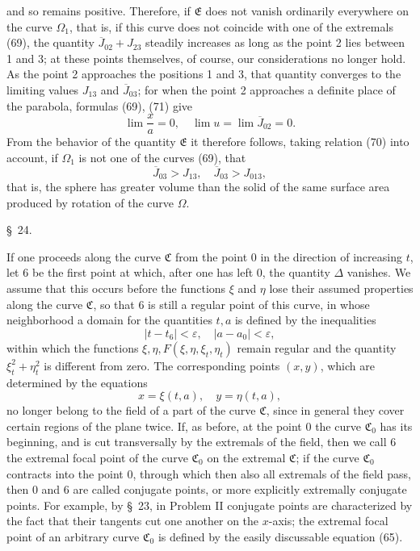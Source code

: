 \documentclass[11pt,a4paper,leqno]{article}
\begin{document}
and so remains positive. Therefore, if $\mathfrak{E}$ does not vanish ordinarily everywhere on the curve $\Omega_1$, that is, if this curve does not coincide with one of the extremals (69), the quantity $\overline{J}_{02}+J_{23}$ steadily increases as long as the point 2 lies between 1 and 3; at these points themselves, of course, our considerations no longer hold. As the point 2 approaches the positions 1 and 3, that quantity converges to the limiting values $J_{13}$ and $\overline{J}_{03}$; for when the point 2 approaches a definite place of the parabola, formulas (69), (71) give
\[
\lim\frac{x}{a}=0,\quad \lim u=\lim\overline{J}_{02}=0.
\]
From the behavior of the quantity $\mathfrak{E}$ it therefore follows, taking relation (70) into account, if $\Omega_1$ is not one of the curves (69), that
\[
\overline{J}_{03}>J_{13},\quad
\overline{J}_{03}>J_{013},
\]
that is, the sphere has greater volume than the solid of the same surface area produced by rotation of the curve $\Omega$.

\begin{center}{\large \S~24.}\end{center}

If one proceeds along the curve $\mathfrak{C}$ from the point 0 in the direction of increasing $t$, let 6 be the first point at which, after one has left 0, the quantity $\Delta$ vanishes. We assume that this occurs before the functions $\xi$ and $\eta$ lose their assumed properties along the curve $\mathfrak{C}$, so that 6 is still a regular point of this curve, in whose neighborhood a domain for the quantities $t,a$ is defined by the inequalities
\[
|t-t_6|<\varepsilon,\quad |a-a_0|<\varepsilon,
\]
within which the functions $\xi,\eta,F(\xi,\eta,\xi_t,\eta_t)$ remain regular and the quantity $\xi_t^2+\eta_t^2$ is different from zero. The corresponding points $(x,y)$, which are determined by the equations
\[
x=\xi(t,a),\quad y=\eta(t,a),
\]
no longer belong to the field of a part of the curve $\mathfrak{C}$, since in general they cover certain regions of the plane twice. If, as before, at the point 0 the curve $\mathfrak{C}_0$ has its beginning, and is cut transversally by the extremals of the field, then we call 6 the extremal focal point of the curve $\mathfrak{C}_0$ on the extremal $\mathfrak{C}$; if the curve $\mathfrak{C}_0$ contracts into the point 0, through which then also all extremals of the field pass, then 0 and 6 are called conjugate points, or more explicitly extremally conjugate points. For example, by \S~23, in Problem II conjugate points are characterized by the fact that their tangents cut one another on the $x$-axis; the extremal focal point of an arbitrary curve $\mathfrak{C}_0$ is defined by the easily discussable equation (65).
\end{document}
